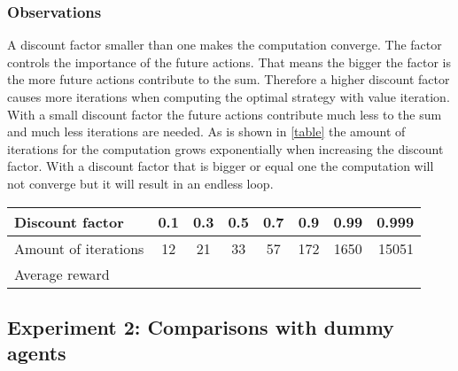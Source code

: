 \documentclass[11pt]{article}
\begin{document}
\subsubsection{Observations}
A discount factor smaller than one makes the computation converge. The factor controls the importance of the future actions. That means the bigger the factor is the more future actions contribute to the sum. Therefore a higher discount factor causes more iterations when computing the optimal strategy with value iteration. With a small discount factor the future actions contribute much less to the sum and much less iterations are needed.  As is shown in \ref{table} the amount of iterations for the computation grows exponentially when increasing the discount factor. With a discount factor that is bigger or equal one the computation will not converge but it will result in an endless loop.

\begin{table*}
\centering
\begin{tabular}{l*{6}{c}r}
Discount factor             & 0.1 & 0.3 & 0.5 & 0.7  & 0.9 & 0.99& 0.999 \\
\hline
Amount of iterations        &12	& 21 & 33 &	57 &172& 1650&15051 \\
Average reward
\end{tabular}
\caption{discount factor's influence on the amount of iterations to compute the optimal strategy }
\label{table} 
\end{table*}





\subsection{Experiment 2: Comparisons with dummy agents}
\end{document}
